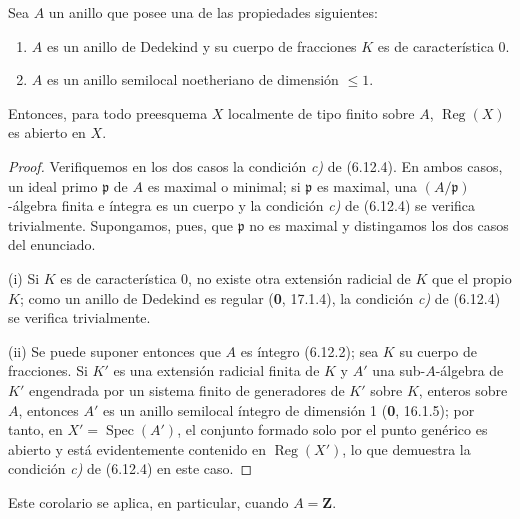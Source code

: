 \begin{corollary}[6.12.6]
\label{IV.2.s6.12.6-fr}
Sea $A$ un anillo que posee una de las propiedades siguientes:
\begin{enumerate}
\item[\textup{(i)}] $A$ es un anillo de Dedekind y su cuerpo de fracciones $K$ es
de característica \textup{0}.
\item[\textup{(ii)}] $A$ es un anillo semilocal noetheriano de dimensión $\leq1$.
\end{enumerate}
Entonces, para todo preesquema $X$ localmente de tipo finito sobre $A$,
$\operatorname{Reg}(X)$ es abierto en $X$.
\end{corollary}

\begin{proof}
Verifiquemos en los dos casos la condición \emph{c)} de (6.12.4). En ambos casos,
un ideal primo $\mathfrak p$ de $A$ es maximal o minimal; si
$\mathfrak p$ es maximal, una $(A/\mathfrak p)$-álgebra finita e íntegra
es un cuerpo y la condición \emph{c)} de (6.12.4) se verifica trivialmente.
Supongamos, pues, que $\mathfrak p$ no es maximal y distingamos los dos casos
del enunciado.

(i) Si $K$ es de característica 0, no existe otra extensión radicial de
$K$ que el propio $K$; como un anillo de Dedekind es regular (\textbf 0, 17.1.4),
la condición \emph{c)} de (6.12.4) se verifica trivialmente.

(ii) Se puede suponer entonces que $A$ es íntegro (6.12.2); sea $K$ su cuerpo
de fracciones. Si $K'$ es una extensión radicial finita de $K$ y $A'$ una
sub-$A$-álgebra de $K'$ engendrada por un sistema finito de generadores de
$K'$ sobre $K$, enteros sobre $A$, entonces $A'$ es un anillo semilocal
íntegro de dimensión 1 (\textbf 0, 16.1.5); por tanto, en
$X'=\operatorname{Spec}(A')$, el conjunto formado solo por el punto genérico
es abierto y está evidentemente contenido en $\operatorname{Reg}(X')$, lo
que demuestra la condición \emph{c)} de (6.12.4) en este caso.
\end{proof}

Este corolario se aplica, en particular, cuando $A=\mathbf Z$.

